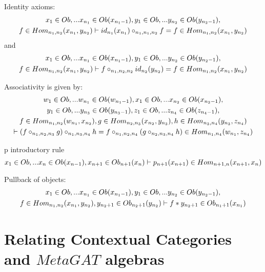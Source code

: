 \documentclass[10pt,a4paper]{article}
\begin{document}
\noindent Identity axioms:
\begin{multline}
\label{leftidentity}
x_1 \in Ob,... x_{{n_1}} \in Ob(x_{{n_1}-1}), y_1 \in Ob,... y_{{n_2}} \in Ob(y_{{n_2}-1}), \\
f \in Hom_{{n_1},{n_2}}(x_{n_1},y_{n_2})
\vdash id_{n_1}(x_{n_1}) \circ_{{n_1},{n_1},{n_2}} f 
                = f 
								 \in Hom_{{n_1},{n_2}}(x_{n_1},y_{n_2})
\end{multline}
\noindent and
\begin{multline}
\label{rightidentity}
x_1 \in Ob,... x_{{n_1}} \in Ob(x_{{n_1}-1}), y_1 \in Ob,... y_{{n_2}} \in Ob(y_{{n_2}-1}), \\
f \in Hom_{{n_1},{n_2}}(x_{n_1},y_{n_2})
\vdash f \circ_{{n_1},{n_2},{n_2}} id_{n_2}(y_{n_2}) 
                = f 
								 \in Hom_{{n_1},{n_2}}(x_{n_1},y_{n_2})
\end{multline}

\noindent Associativity is given by:
\begin{multline}
\label{associativity}
w_1 \in Ob,... w_{{n_1}} \in Ob(w_{{n_1}-1}),x_1 \in Ob,... x_{{n_2}} \in Ob(x_{{n_2}-1}), \\
y_1 \in Ob,... y_{{n_3}} \in Ob(y_{{n_3}-1}),z_1 \in Ob,... z_{{n_4}} \in Ob(z_{{n_4}-1}), \\
f \in Hom_{{n_1},{n_2}}(w_{n_1},x_{n_2}), 
g \in Hom_{{n_2},{n_3}}(x_{n_2},y_{n_3}), 
h \in Hom_{{n_3},{n_4}}(y_{n_3},z_{n_4}) \\
\vdash (f \circ_{{n_1},{n_2},{n_3}} g) \circ_{n_1,n_3,n_4} h 
                 = f \circ_{{n_1},{n_2},{n_4}} ( g \circ_{n_2,n_3,n_4} h )
								 \in Hom_{{n_1},{n_4}}(w_{n_1},z_{n_4})
\end{multline}

\noindent p introductory rule
\noindent 
\begin{equation}
x_1 \in Ob,... x_{n} \in Ob(x_{n-1}), x_{n+1} \in Ob_{n+1}(x_n) 
\vdash p_{n+1}(x_{n+1}) \in Hom_{n+1,n}(x_{n+1},x_n)
\end{equation}

\noindent Pullback of objects:
\begin{multline}
x_1 \in Ob,... x_{{n_1}} \in Ob(x_{{n_1}-1}), y_1 \in Ob,... y_{{n_2}} \in Ob(y_{{n_2}-1}), \\
f \in Hom_{{n_1},{n_2}}(x_{n_1},y_{n_2}),
y_{{n_2}+1} \in Ob_{{n_2}+1}(y_{n_2}) 
\vdash f*y_{{n_2}+1} \in Ob_{n_1+1}(x_{n_1})
\end{multline}

\section{Relating Contextual Categories and $MetaGAT$ algebras}
\end{document}
